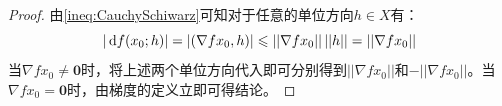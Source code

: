\begin{proof}
	由\cref{ineq:CauchySchiwarz}可知对于任意的单位方向$h\in X$有：
	\begin{equation*}
		|\mathop{}\!\mathrm{d} f(x_0;h)|=|(\nabla fx_0,h)|
		\leqslant||\nabla fx_0||\,||h||=||\nabla fx_0||
	\end{equation*}
	当$\nabla fx_0\ne\mathbf{0}$时，将上述两个单位方向代入即可分别得到$||\nabla fx_0||$和$-||\nabla fx_0||$。当$\nabla fx_0=\mathbf{0}$时，由梯度的定义立即可得结论。
\end{proof}
